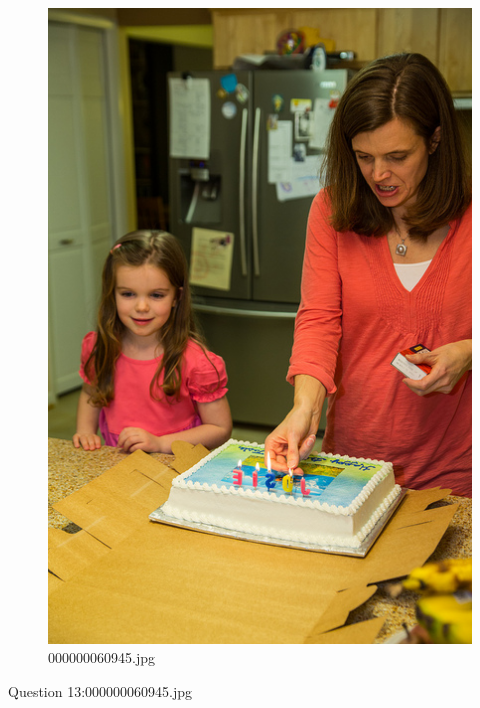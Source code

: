     \begin{figure}[h]
        \centering
        \includegraphics[width=0.8\linewidth]{../image set/easy/000000060945.jpg}
        \caption{000000060945.jpg}
    \end{figure}
    Question 13:000000060945.jpg
